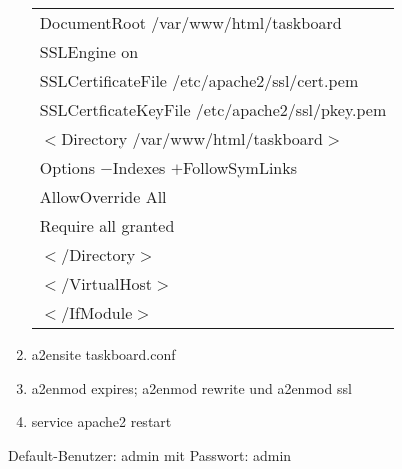 \begin{enumerate}
\begin{table}
\begin{tabular}{|l|}
        { }{ }{ }{ }{ }{ }DocumentRoot /var/www/html/taskboard\\
        { }{ }{ }{ }{ }{ }SSLEngine on \\
        { }{ }{ }{ }{ }{ }SSLCertificateFile /etc/apache2/ssl/cert.pem\\
        { }{ }{ }{ }{ }{ }SSLCertficateKeyFile /etc/apache2/ssl/pkey.pem\\
        { }{ }{ }{ }{ }{ }$<$Directory /var/www/html/taskboard$>$\\
        { }{ }{ }{ }{ }{ }{ }{ }{ }Options $-$Indexes $+$FollowSymLinks\\
        { }{ }{ }{ }{ }{ }{ }{ }{ }AllowOverride All \\
        { }{ }{ }{ }{ }{ }{ }{ }{ }Require all granted \\
        { }{ }{ }{ }{ }{ }$<$/Directory$>$ \\
       { }{ }{ }$<$/VirtualHost$>$ \\
       $<$/IfModule$>$\\
				\hline
			\end{tabular}
		\label{tab:taskboardConf}
	\end{table}
	\item a2ensite taskboard.conf
	\item a2enmod expires; a2enmod rewrite und a2enmod ssl
	\item service apache2 restart
\end{enumerate}
Default-Benutzer: admin mit Passwort: admin
\newpage

